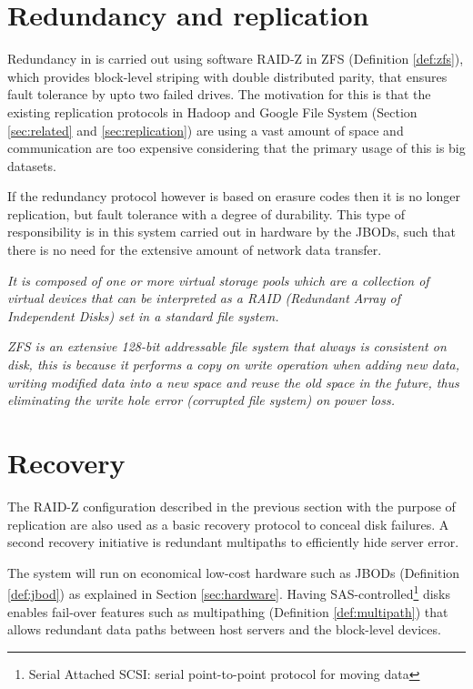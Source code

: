\section{Redundancy and replication}
Redundancy in \CodeName is carried out using \eg software RAID-Z in ZFS (Definition \ref{def:zfs}), which provides block-level striping with double distributed parity, that ensures fault tolerance by upto two failed drives. The motivation for this is that the existing replication protocols in \eg Hadoop and Google File System (Section \ref{sec:related} and \ref{sec:replication}) are using a vast amount of space and communication are too expensive considering that the primary usage of this is big datasets.
\newline

If the redundancy protocol however is based on erasure codes then it is no longer replication, but fault tolerance with a degree of durability. This type of responsibility is in this system carried out in hardware by the JBODs, such that there is no need for the extensive amount of network data transfer.

\begin{definition}[ZFS] \label{def:zfs}
\textit{It is composed of one or more virtual storage pools which are a collection of virtual devices that can be interpreted as a RAID (Redundant Array of Independent Disks) set in a standard file system.}
\newline

\textit{ZFS is an extensive 128-bit addressable file system that always is consistent on disk, this is because it performs a copy on write operation when adding new data, \ie writing modified data into a new space and reuse the old space in the future, thus eliminating the write hole error (corrupted file system) \eg on power loss.}
\end{definition}

\section{Recovery} \label{sec:recovery}
The RAID-Z configuration described in the previous section with the purpose of replication are also used as a basic recovery protocol to conceal disk failures. A second recovery initiative is redundant multipaths to efficiently hide server error.
\newline

The system will run on economical low-cost hardware such as JBODs (Definition \ref{def:jbod}) as explained in Section \ref{sec:hardware}. Having SAS-controlled\footnote{Serial Attached SCSI: serial point-to-point protocol for moving data} disks enables fail-over features such as multipathing (Definition \ref{def:multipath}) that allows redundant data paths between host servers and the block-level devices.

